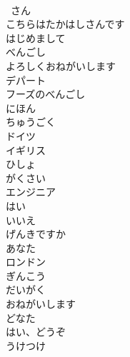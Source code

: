 \documentclass[8pt]{extreport}
\begin{document}
\begin{CJK}{UTF8}{min}
\\	~さん
\\	こちらはたかはしさんです
\\	はじめまして
\\	べんごし
\\	よろしくおねがいします
\\	デパート
\\	フーズのべんごし
\\	にほん
\\	ちゅうごく
\\	ドイツ
\\	イギリス
\\	ひしょ
\\	がくさい
\\	エンジニア
\\	はい
\\	いいえ
\\	げんきですか
\\	あなた
\\	ロンドン
\\	ぎんこう
\\	だいがく
\\	おねがいします
\\	どなた
\\	はい、どうぞ
\\	うけつけ
\end{CJK}
\end{document}
